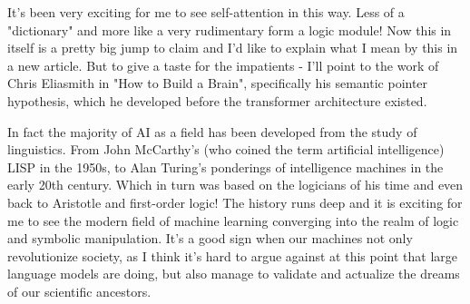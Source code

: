 It's been very exciting for me to see self-attention in this way. Less of a "dictionary" and more like a very rudimentary form a logic module! Now this in itself is a pretty big jump to claim and I'd like to explain what I mean by this in a new article. But to give a taste for the impatients - I'll point to the work of Chris Eliasmith in "How to Build a Brain", specifically his semantic pointer hypothesis, which he developed before the transformer architecture existed.

In fact the majority of AI as a field has been developed from the study of linguistics. From John McCarthy's (who coined the term artificial intelligence) LISP in the 1950s, to Alan Turing's ponderings of intelligence machines in the early 20th century. Which in turn was based on the logicians of his time and even back to Aristotle and first-order logic! The history runs deep and it is exciting for me to see the modern field of machine learning converging into the realm of logic and symbolic manipulation. It's a good sign when our machines not only revolutionize society, as I think it's hard to argue against at this point that large language models are doing, but also manage to validate and actualize the dreams of our scientific ancestors.
